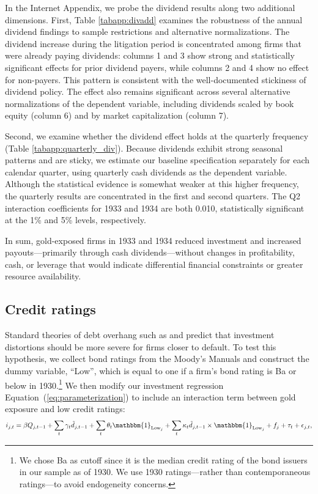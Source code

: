 In the Internet Appendix, we probe the dividend results along two additional dimensions. First, Table \ref{tabapp:divadd} examines the robustness of the annual dividend findings to sample restrictions and alternative normalizations. The dividend increase during the litigation period is concentrated among firms that were already paying dividends: columns 1 and 3 show strong and statistically significant effects for prior dividend payers, while columns 2 and 4 show no effect for non-payers. This pattern is consistent with the well-documented stickiness of dividend policy. The effect also remains significant across several alternative normalizations of the dependent variable, including dividends scaled by book equity (column 6) and by market capitalization (column 7).

Second, we examine whether the dividend effect holds at the quarterly frequency (Table \ref{tabapp:quarterly_div}). Because dividends exhibit strong seasonal patterns and are sticky, we estimate our baseline specification separately for each calendar quarter, using quarterly cash dividends as the dependent variable. Although the statistical evidence is somewhat weaker at this higher frequency, the quarterly results are concentrated in the first and second quarters. The Q2 interaction coefficients for 1933 and 1934 are both 0.010, statistically significant at the 1\% and 5\% levels, respectively.

In sum, gold-exposed firms in 1933 and 1934 reduced investment and increased payouts---primarily through cash dividends---without changes in profitability, cash, or leverage that would indicate differential financial constraints or greater resource availability.

\subsection{Credit ratings}
\label{sec:rating}

\noindent Standard theories of debt overhang such as \cite{Myers1977} and \cite{Hennessy2004} predict that investment distortions should be more severe for firms closer to default. To test this hypothesis, we collect bond ratings from the Moody's Manuals and construct the dummy variable, ``Low'', which is equal to one if a firm's bond rating is Ba or below in 1930.\footnote{We chose Ba as cutoff since it is the median credit rating of the bond issuers in our sample as of 1930. We use 1930 ratings---rather than contemporaneous ratings---to avoid endogeneity concerns.} We then modify our investment regression Equation~(\ref{eq:parameterization}) to include an interaction term between gold exposure and low credit ratings:
\begin{align}
\label{eq:parameterization_by_ratings}
i_{j,t} = \beta Q_{j,t-1} + \sum_{t} \gamma_{t} \tilde{d}_{j,t-1} + \sum_{t} \theta_{t} \mathbbm{1}_{\text{Low}_{j}} + \sum_{t} \kappa_{t} \tilde{d}_{j,t-1} \times \mathbbm{1}_{\text{Low}_{j}} + f_{j} + \tau_{t} + \epsilon_{j,t},
\end{align}


